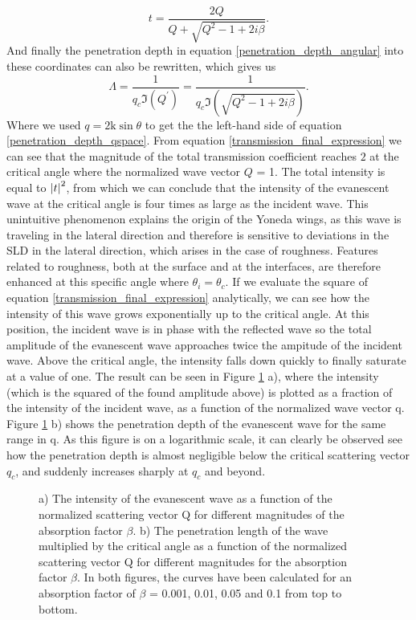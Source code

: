  \begin{equation}\label{transmission_final_expression}
	t = \frac{2Q}{Q + \sqrt{Q^2 - 1 + 2i\beta}}.
\end{equation}
And finally the penetration depth in equation \ref{penetration_depth_angular} into these coordinates can also be rewritten, which gives us
\begin{equation}\label{penetration_depth_qspace}
	\Lambda = \frac{1}{q_c \Im(Q^{\prime})} = \frac{1}{q_c\Im(\sqrt{Q^2 - 1 + 2i\beta})}.
\end{equation} 
Where we used $q = \textrm{2k} \sin{\theta}$ to get the the left-hand side of equation \ref{penetration_depth_qspace}. From equation \ref{transmission_final_expression} we can see that the magnitude of the total transmission coefficient reaches $2$ at the critical angle where the normalized wave vector $Q$ = 1. The total intensity is equal to $\abs{t}^2$, from which we can conclude that the intensity of the evanescent wave at the critical angle is four times as large as the incident wave. This unintuitive phenomenon explains the origin of the Yoneda wings, as this wave is traveling in the lateral direction and therefore is sensitive to deviations in the SLD in the lateral direction, which arises in the case of roughness. Features related to roughness, both at the surface and at the interfaces, are therefore enhanced at this specific angle where $\theta_i = \theta_c$. If we evaluate the square of equation \ref{transmission_final_expression} analytically, we can see how the intensity of this wave grows exponentially up to the critical angle. At this position, the incident wave is in phase with the reflected wave so the total amplitude of the evanescent wave approaches twice the ampitude of the incident wave. Above the critical angle, the intensity falls down quickly to finally saturate at a value of one. The result can be seen in Figure \ref{graph} a), where the intensity (which is the squared of the found amplitude above) is plotted as a fraction of the intensity of the incident wave, as a function of the normalized wave vector q. Figure \ref{graph} b) shows the penetration depth of the evanescent wave for the same range in q. As this figure is on a logarithmic scale, it can clearly be observed see how the penetration depth is almost negligible below the critical scattering vector $q_c$, and suddenly increases sharply at $q_c$ and beyond.  
\begin{figure}
	\centering
	\def\svgwidth{\textwidth}
	
	\caption{a) The intensity of the evanescent wave as a function of the normalized scattering vector Q for different magnitudes of the absorption factor $\beta$. b) The penetration length of the wave multiplied by the critical angle as a function of the normalized scattering vector Q for different magnitudes for the absorption factor $\beta$. In both figures, the curves have been calculated for an absorption factor of $\beta$ = 0.001, 0.01, 0.05 and 0.1 from top to bottom.} 
	\label{graph}
\end{figure}
